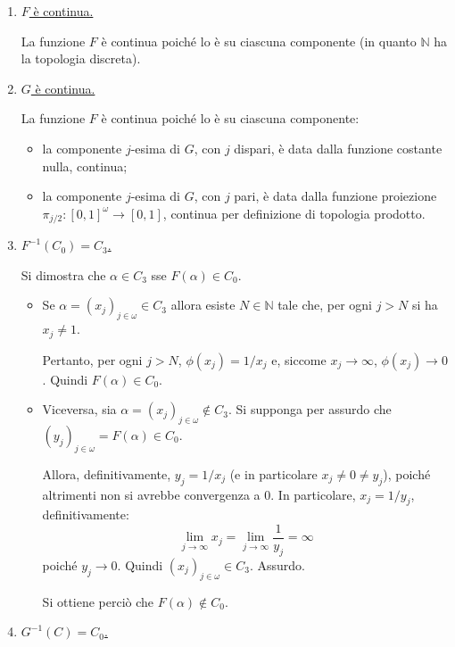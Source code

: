\documentclass{article}
\newcommand{\1}{\mathds{1}}
\newcommand{\N}{\mathds{N}}
\begin{document}
\begin{enumerate}
\item \underline{\(F\) è continua.}
\label{sec:org215824a}

La funzione \(F\) è continua poiché lo è su ciascuna componente (in quanto \(\N\) ha la topologia discreta).
\item \underline{\(G\) è continua.}
\label{sec:orgf3e2a55}

La funzione \(F\) è continua poiché lo è su ciascuna componente:
\begin{itemize}
\item la componente \(j\)-esima di \(G\), con \(j\) dispari, è data dalla funzione costante nulla, continua;
\item la componente \(j\)-esima di \(G\), con \(j\) pari, è data dalla funzione proiezione \(\pi_{j/2}: [0,1]^{\omega}\to [0,1]\), continua per definizione di topologia prodotto.
\end{itemize}
\item \underline{\(F^{-1}(C_{0})=C_{3}\).}
\label{sec:orgf6404b8}

Si dimostra che \(\alpha \in C_{3}\) sse \(F(\alpha) \in C_{0}\).

\begin{itemize}
\item Se \(\alpha = (x_{j})_{j \in \omega}\in C_{3}\) allora esiste \(N \in \N\) tale che, per ogni \(j>N\) si ha\(x_{j}\neq 1\).

Pertanto, per ogni \(j>N\), \(\phi(x_{j}) = 1/x_{j}\) e, siccome \(x_{j}\to \infty\), \(\phi(x_{j})\to 0\). Quindi \(F(\alpha) \in C_{0}\).
\item Viceversa, sia \(\alpha = (x_{j})_{j \in \omega} \notin C_{3}\). Si supponga per assurdo che \((y_{j})_{j \in \omega} = F(\alpha) \in C_{0}\).

Allora, definitivamente, \(y_{j} = 1/x_{j}\) (e in particolare \(x_{j}\neq 0\neq y_{j}\)), poiché altrimenti non si avrebbe convergenza a \(0\). In particolare, \(x_{j} = 1/y_{j}\), definitivamente:
\begin{equation*}
  \lim_{j\to \infty} x_{j} = \lim_{j\to\infty}\frac{1}{y_{j}} = \infty
\end{equation*}
poiché \(y_{j}\to 0\). Quindi \((x_{j})_{j \in \omega} \in C_{3}\). Assurdo.

Si ottiene perciò che \(F(\alpha) \notin C_{0}\).
\end{itemize}
\item \underline{\(G^{-1}(C)=C_{0}\).}
\label{sec:orgd18b9e9}


\end{enumerate}
\end{document}

